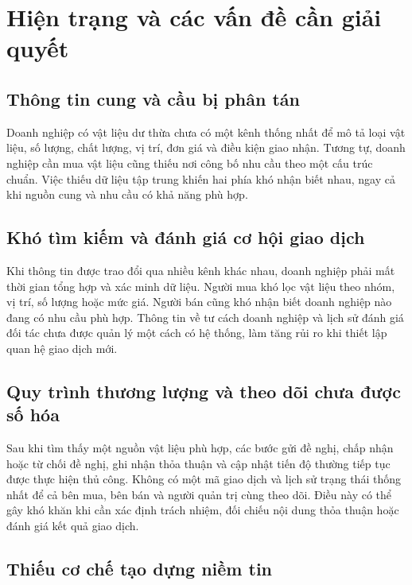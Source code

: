 \documentclass[12pt,a4paper,oneside]{report}
\begin{document}
\section{Hiện trạng và các vấn đề cần giải quyết}
\label{sec:hien-trang}

\subsection{Thông tin cung và cầu bị phân tán}

Doanh nghiệp có vật liệu dư thừa chưa có một kênh thống nhất để mô tả loại vật
liệu, số lượng, chất lượng, vị trí, đơn giá và điều kiện giao nhận. Tương tự,
doanh nghiệp cần mua vật liệu cũng thiếu nơi công bố nhu cầu theo một cấu trúc
chuẩn. Việc thiếu dữ liệu tập trung khiến hai phía khó nhận biết nhau, ngay cả
khi nguồn cung và nhu cầu có khả năng phù hợp.

\subsection{Khó tìm kiếm và đánh giá cơ hội giao dịch}

Khi thông tin được trao đổi qua nhiều kênh khác nhau, doanh nghiệp phải mất thời
gian tổng hợp và xác minh dữ liệu. Người mua khó lọc vật liệu theo nhóm, vị trí,
số lượng hoặc mức giá. Người bán cũng khó nhận biết doanh nghiệp nào đang có nhu
cầu phù hợp. Thông tin về tư cách doanh nghiệp và lịch sử đánh giá đối tác chưa
được quản lý một cách có hệ thống, làm tăng rủi ro khi thiết lập quan hệ giao
dịch mới.

\subsection{Quy trình thương lượng và theo dõi chưa được số hóa}

Sau khi tìm thấy một nguồn vật liệu phù hợp, các bước gửi đề nghị, chấp nhận hoặc
từ chối đề nghị, ghi nhận thỏa thuận và cập nhật tiến độ thường tiếp tục được
thực hiện thủ công. Không có một mã giao dịch và lịch sử trạng thái thống nhất
để cả bên mua, bên bán và người quản trị cùng theo dõi. Điều này có thể gây khó
khăn khi cần xác định trách nhiệm, đối chiếu nội dung thỏa thuận hoặc đánh giá kết
quả giao dịch.

\subsection{Thiếu cơ chế tạo dựng niềm tin}
\end{document}
